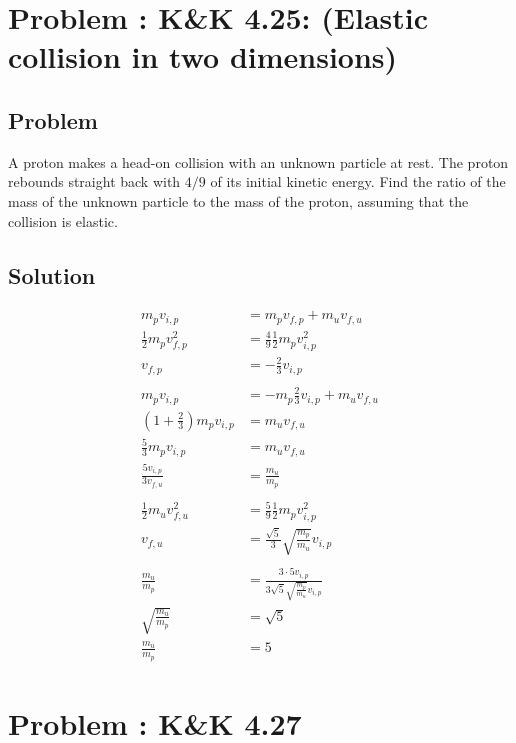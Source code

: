\documentclass[solutions]{esg8012pset}
\begin{document}
\section{Problem \thesection: K\&K 4.25: (Elastic collision in two dimensions)}
\subsection{Problem}
  A proton makes a head-on collision with an unknown particle at rest. The proton rebounds straight back with $4 / 9$ of its initial kinetic energy. Find the ratio of the mass of the unknown particle to the mass of the proton, assuming that the collision is elastic.
\subsection{Solution}
  \begin{align*}
  m_p v_{i, p} & = m_p v_{f,p} + m_u v_{f, u} \\
  \frac{1}{2}m_p v_{f, p}^2 & = \frac{4}{9} \frac{1}{2}m_p v_{i, p}^2 \\
  v_{f, p} & = -\frac{2}{3}v_{i, p} \\
  \\
  m_p v_{i, p} & = -m_p \frac{2}{3}v_{i, p} + m_u v_{f, u} \\
  \left(1 + \frac{2}{3}\right)m_p v_{i, p} & = m_u v_{f, u} \\
  \frac{5}{3}m_p v_{i, p} & = m_u v_{f, u} \\
  \frac{5v_{i, p}}{3v_{f, u}} & = \frac{m_u}{m_p} \\
  \\
  \frac{1}{2}m_u v_{f, u}^2 & = \frac{5}{9}\frac{1}{2}m_p v_{i, p}^2 \\
  v_{f, u} & = \frac{\sqrt{5}}{3}\sqrt{\frac{m_p}{m_u}} v_{i, p} \\
  \\
  \frac{m_u}{m_p} & = \frac{3\cdot 5 v_{i, p}}{3\sqrt{5}\sqrt{\frac{m_p}{m_u}} v_{i, p}}  \\
  \sqrt{\frac{m_u}{m_p}} & = \sqrt{5}  \\
  \frac{m_u}{m_p} & = 5
  \end{align*}
\section{Problem \thesection: K\&K 4.27}
\end{document}
